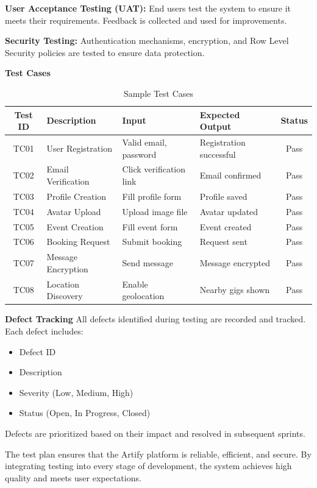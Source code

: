 \documentclass[12pt,a4paper]{report}
\begin{document}
\textbf{User Acceptance Testing (UAT):}  
End users test the system to ensure it meets their requirements. Feedback is collected and used for improvements.

\textbf{Security Testing:}  
Authentication mechanisms, encryption, and Row Level Security policies are tested to ensure data protection.

\textbf{Test Cases}

\begin{table}[h]
\centering
\caption{Sample Test Cases}
\begin{tabular}{|c|p{3cm}|p{3cm}|p{3cm}|c|}
\hline
\textbf{Test ID} & \textbf{Description} & \textbf{Input} & \textbf{Expected Output} & \textbf{Status} \\
\hline
TC01 & User Registration & Valid email, password & Registration successful & Pass \\
\hline
TC02 & Email Verification & Click verification link & Email confirmed & Pass \\
\hline
TC03 & Profile Creation & Fill profile form & Profile saved & Pass \\
\hline
TC04 & Avatar Upload & Upload image file & Avatar updated & Pass \\
\hline
TC05 & Event Creation & Fill event form & Event created & Pass \\
\hline
TC06 & Booking Request & Submit booking & Request sent & Pass \\
\hline
TC07 & Message Encryption & Send message & Message encrypted & Pass \\
\hline
TC08 & Location Discovery & Enable geolocation & Nearby gigs shown & Pass \\
\hline
\end{tabular}
\end{table}

\textbf{Defect Tracking}
All defects identified during testing are recorded and tracked. Each defect includes:
\begin{itemize}
    \item Defect ID
    \item Description
    \item Severity (Low, Medium, High)
    \item Status (Open, In Progress, Closed)
\end{itemize}

Defects are prioritized based on their impact and resolved in subsequent sprints.

The test plan ensures that the Artify platform is reliable, efficient, and secure. By integrating testing into every stage of development, the system achieves high quality and meets user expectations.
\end{document}
